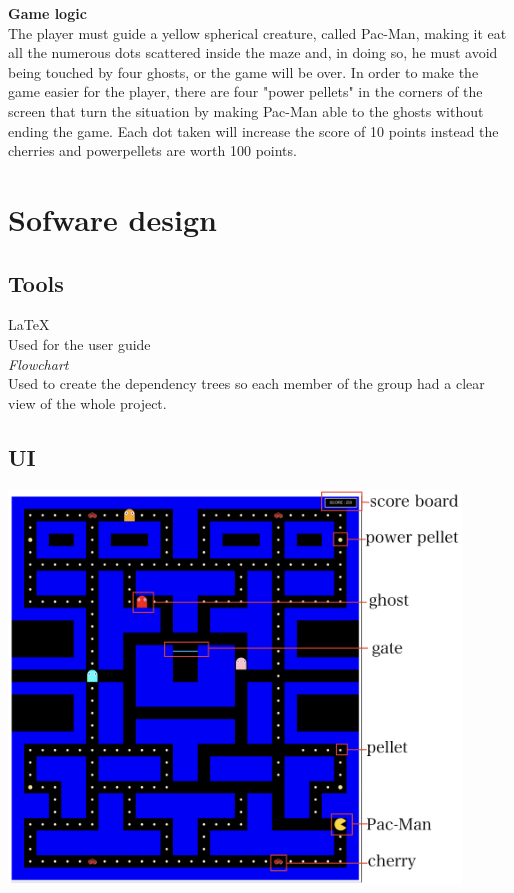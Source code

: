 \documentclass{article}
\begin{document}
 \textbf{Game logic}\\
The player must guide a yellow spherical creature, called Pac-Man, making it eat all the numerous dots scattered inside the maze and, in doing so, he must avoid being touched by four ghosts, or the game will be over. In order to make the game easier for the player, there are four "power pellets" in the corners of the screen that turn the situation by making Pac-Man able to the ghosts without ending the game. Each dot taken will increase the score of 10 points instead the cherries and powerpellets are worth 100 points.

 \section{Sofware design}
 \subsection{Tools}
 \hspace{0.5cm}\LaTeX \\
 Used for the user guide\\
 
 \textit{Flowchart}\\
 Used to create the dependency trees so each member of the group had a clear view of the whole project.
 

 \subsection{UI}
\begin{center}
\includegraphics[width=12cm]{./images/user_interface.png}
\end{center}
\end{document}
